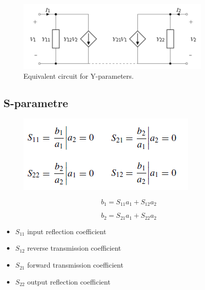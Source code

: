 \begin{figure} [H]
	\centering
	\includegraphics[width=0.6\linewidth]{graphics/38.png}
	\caption{Equivalent circuit for Y-parameters.}
	\label{fig:38}
\end{figure}

\subsection{S-parametre}
\begin{figure} [H]
	\centering
	\includegraphics[width=0.5\linewidth]{graphics/40.png}
\end{figure}

\begin{equation}
b_1 = S_{11} a_1 + S_{12} a_2
\end{equation}

\begin{equation}
b_2 = S_{21} a_1 + S_{22} a_2
\end{equation}

\begin{itemize}
	\item $S_{11}$ input reflection coefficient
	\item $S_{12}$ reverse transmission coefficient
	\item $S_{21}$ forward transmission coefficient
	\item $S_{22}$ output reflection coefficient
\end{itemize}



